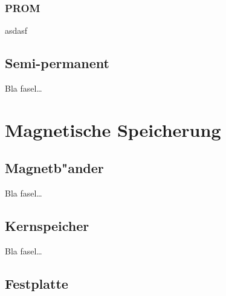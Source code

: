 				\subsubsection{PROM}
				\label{ch:Technisch:sec:Elektronische Speicherung:sub:Fl"uchtig:subsub:PROM}
				
				asdasf
            
        \subsection{Semi-permanent}
        \label{ch:Technisch:sec:Elektronische Speicherung:sub:Semi-permanent}
        
            Bla fasel\ldots
			
			
			
			
    \section{Magnetische Speicherung}
    \label{ch:Technisch:sec:Magnetische Speicherung}
        \subsection{Magnetb"ander}
        \label{ch:Technisch:sec:Magnetische Speicherung:sub:Magnetb"ander}
        
            Bla fasel\ldots
            
        \subsection{Kernspeicher}
        \label{ch:Technisch:sec:Magnetische Speicherung:sub:Kernspeicher}
        
            Bla fasel\ldots
            
        \subsection{Festplatte}
        \label{ch:Technisch:sec:Magnetische Speicherung:sub:Festplatte}
        
